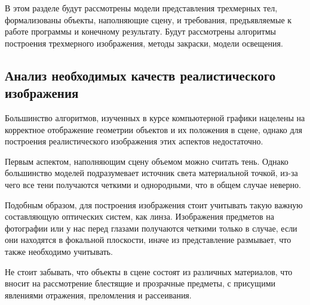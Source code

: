 
В этом разделе будут рассмотрены модели представления трехмерных тел,
формализованы объекты, наполняющие сцену, и требования, предъявляемые к
работе программы и конечному результату. Будут рассмотрены алгоритмы
построения трехмерного изображения, методы закраски, модели освещения.

\subsection{Анализ необходимых качеств реалистического изображения} \label{ssec:necessary_qualities}
Большинство алгоритмов, изученных в курсе компьютерной графики
нацелены на корректное отображение геометрии объектов и их положения в сцене,
однако для построения реалистического изображения этих аспектов недостаточно.

Первым аспектом, наполняющим сцену объемом можно считать тень. Однако
большинство моделей подразумевает источник света материальной точкой, из-за
чего все тени получаются четкими и однородными, что в общем случае неверно.

Подобным образом, для построения изображения стоит учитывать такую
важную составляющую оптических систем, как линза. Изображения предметов на
фотографии или у нас перед глазами получаются четкими только в случае, если они
находятся в фокальной плоскости, иначе из представление размывает, что также
необходимо учитывать.

Не стоит забывать, что объекты в сцене состоят из различных материалов, что
вносит на рассмотрение блестящие и прозрачные предметы, с присущими
явлениями отражения, преломления и рассеивания.

